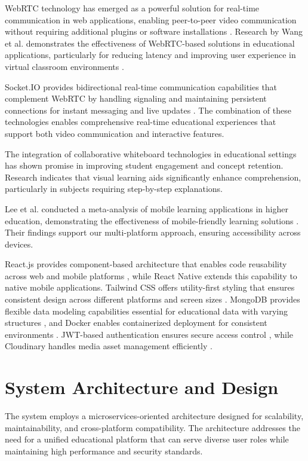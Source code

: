 \documentclass[onecolumn]{IEEEtran}
\begin{document}
WebRTC technology has emerged as a powerful solution for real-time communication in web applications, enabling peer-to-peer video communication without requiring additional plugins or software installations \cite{webrtc2024}. Research by Wang et al. demonstrates the effectiveness of WebRTC-based solutions in educational applications, particularly for reducing latency and improving user experience in virtual classroom environments \cite{wang2022}.

Socket.IO provides bidirectional real-time communication capabilities that complement WebRTC by handling signaling and maintaining persistent connections for instant messaging and live updates \cite{socketio2024}. The combination of these technologies enables comprehensive real-time educational experiences that support both video communication and interactive features.

The integration of collaborative whiteboard technologies in educational settings has shown promise in improving student engagement and concept retention. Research indicates that visual learning aids significantly enhance comprehension, particularly in subjects requiring step-by-step explanations.

Lee et al. conducted a meta-analysis of mobile learning applications in higher education, demonstrating the effectiveness of mobile-friendly learning solutions \cite{lee2022}. Their findings support our multi-platform approach, ensuring accessibility across devices.

React.js provides component-based architecture that enables code reusability across web and mobile platforms \cite{react2024}, while React Native extends this capability to native mobile applications. Tailwind CSS offers utility-first styling that ensures consistent design across different platforms and screen sizes \cite{tailwind2024}. MongoDB provides flexible data modeling capabilities essential for educational data with varying structures \cite{mongodb2024}, and Docker enables containerized deployment for consistent environments \cite{docker2024}. JWT-based authentication ensures secure access control \cite{jwt2024}, while Cloudinary handles media asset management efficiently \cite{cloudinary2024}.

\section{System Architecture and Design}

The system employs a microservices-oriented architecture designed for scalability, maintainability, and cross-platform compatibility. The architecture addresses the need for a unified educational platform that can serve diverse user roles while maintaining high performance and security standards.
\end{document}
